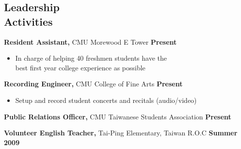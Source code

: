 \documentclass[sectioned]{dsyangres}
\begin{document}
\begin{resume}
\section{Leadership \\ Activities}

\textbf{Resident Assistant,} CMU Morewood E Tower \hfill \textbf{Present}
  \begin{itemize} \itemsep -2pt
    \item In charge of helping 40 freshmen students have the\\ best
      first year college experience as possible
  \end{itemize}

\textbf{Recording Engineer,} CMU College of Fine Arts \hfill \textbf{Present}
  \begin{itemize} \itemsep -2pt
    \item Setup and record student concerts and recitals (audio/video)
  \end{itemize}

\textbf{Public Relations Officer,} CMU Taiwanese Students
  Association \hfill \textbf{ Present}

\textbf{Volunteer English Teacher,} Tai-Ping Elementary, Taiwan R.O.C \hfill \textbf{ Summer 2009}

\end{resume}
\end{document}
